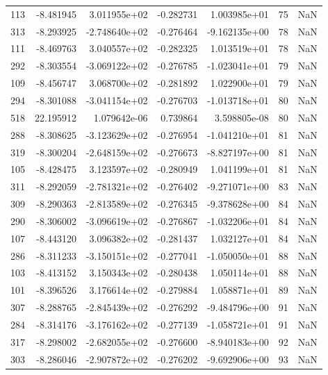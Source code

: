 \begin{tabular}{rrrrrrr}
 113 &  -8.481945 &  3.011955e+02 & -0.282731 &  1.003985e+01 &          75 & NaN \\
 313 &  -8.293925 & -2.748640e+02 & -0.276464 & -9.162135e+00 &          78 & NaN \\
 111 &  -8.469763 &  3.040557e+02 & -0.282325 &  1.013519e+01 &          78 & NaN \\
 292 &  -8.303554 & -3.069122e+02 & -0.276785 & -1.023041e+01 &          79 & NaN \\
 109 &  -8.456747 &  3.068700e+02 & -0.281892 &  1.022900e+01 &          79 & NaN \\
 294 &  -8.301088 & -3.041154e+02 & -0.276703 & -1.013718e+01 &          80 & NaN \\
 518 &  22.195912 &  1.079642e-06 &  0.739864 &  3.598805e-08 &          80 & NaN \\
 288 &  -8.308625 & -3.123629e+02 & -0.276954 & -1.041210e+01 &          81 & NaN \\
 319 &  -8.300204 & -2.648159e+02 & -0.276673 & -8.827197e+00 &          81 & NaN \\
 105 &  -8.428475 &  3.123597e+02 & -0.280949 &  1.041199e+01 &          81 & NaN \\
 311 &  -8.292059 & -2.781321e+02 & -0.276402 & -9.271071e+00 &          83 & NaN \\
 309 &  -8.290363 & -2.813589e+02 & -0.276345 & -9.378628e+00 &          84 & NaN \\
 290 &  -8.306002 & -3.096619e+02 & -0.276867 & -1.032206e+01 &          84 & NaN \\
 107 &  -8.443120 &  3.096382e+02 & -0.281437 &  1.032127e+01 &          84 & NaN \\
 286 &  -8.311233 & -3.150151e+02 & -0.277041 & -1.050050e+01 &          88 & NaN \\
 103 &  -8.413152 &  3.150343e+02 & -0.280438 &  1.050114e+01 &          88 & NaN \\
 101 &  -8.396526 &  3.176614e+02 & -0.279884 &  1.058871e+01 &          89 & NaN \\
 307 &  -8.288765 & -2.845439e+02 & -0.276292 & -9.484796e+00 &          91 & NaN \\
 284 &  -8.314176 & -3.176162e+02 & -0.277139 & -1.058721e+01 &          91 & NaN \\
 317 &  -8.298002 & -2.682055e+02 & -0.276600 & -8.940183e+00 &          92 & NaN \\
 303 &  -8.286046 & -2.907872e+02 & -0.276202 & -9.692906e+00 &          93 & NaN \\

\end{tabular}
